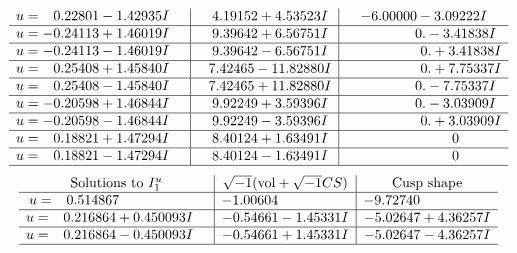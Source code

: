 \documentclass[1p]{elsarticle_modified}
\theoremstyle{definition}
\newcommand{\I}{\sqrt{-1}}
\begin{document}
$$\begin{array}{c|c|c}
\begin{aligned}
u &= \phantom{-}0.22801 - 1.42935 I\end{aligned}
 & \phantom{-}4.19152 + 4.53523 I & -6.00000 - 3.09222 I \\ \hline\begin{aligned}
u &= -0.24113 + 1.46019 I\end{aligned}
 & \phantom{-}9.39642 + 6.56751 I & \phantom{-0.000000 } 0. - 3.41838 I \\ \hline\begin{aligned}
u &= -0.24113 - 1.46019 I\end{aligned}
 & \phantom{-}9.39642 - 6.56751 I & \phantom{-0.000000 -}0. + 3.41838 I \\ \hline\begin{aligned}
u &= \phantom{-}0.25408 + 1.45840 I\end{aligned}
 & \phantom{-}7.42465 - 11.82880 I & \phantom{-0.000000 -}0. + 7.75337 I \\ \hline\begin{aligned}
u &= \phantom{-}0.25408 - 1.45840 I\end{aligned}
 & \phantom{-}7.42465 + 11.82880 I & \phantom{-0.000000 } 0. - 7.75337 I \\ \hline\begin{aligned}
u &= -0.20598 + 1.46844 I\end{aligned}
 & \phantom{-}9.92249 + 3.59396 I & \phantom{-0.000000 } 0. - 3.03909 I \\ \hline\begin{aligned}
u &= -0.20598 - 1.46844 I\end{aligned}
 & \phantom{-}9.92249 - 3.59396 I & \phantom{-0.000000 -}0. + 3.03909 I \\ \hline\begin{aligned}
u &= \phantom{-}0.18821 + 1.47294 I\end{aligned}
 & \phantom{-}8.40124 + 1.63491 I & \phantom{-0.000000 } 0 \\ \hline\begin{aligned}
u &= \phantom{-}0.18821 - 1.47294 I\end{aligned}
 & \phantom{-}8.40124 - 1.63491 I & \phantom{-0.000000 } 0\\
 \hline 
 \end{array}$$\newpage$$\begin{array}{c|c|c}  
\text{Solutions to }I^u_{1}& \I (\text{vol} + \sqrt{-1}CS) & \text{Cusp shape}\\
 \hline 
\begin{aligned}
u &= \phantom{-}0.514867\phantom{ +0.000000I}\end{aligned}
 & -1.00604\phantom{ +0.000000I} & -9.72740\phantom{ +0.000000I} \\ \hline\begin{aligned}
u &= \phantom{-}0.216864 + 0.450093 I\end{aligned}
 & -0.54661 - 1.45331 I & -5.02647 + 4.36257 I \\ \hline\begin{aligned}
u &= \phantom{-}0.216864 - 0.450093 I\end{aligned}
 & -0.54661 + 1.45331 I & -5.02647 - 4.36257 I\\
 \hline 
 \end{array}$$\newpage
\end{document}
